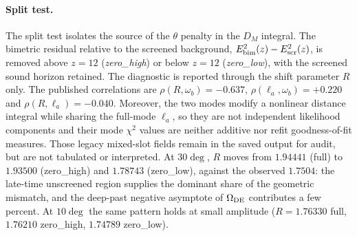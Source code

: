 \paragraph{Split test.}
The split test isolates the source of the $\theta$ penalty in the $D_M$ integral. The bimetric residual relative to the screened background, $E^2_{\rm bim}(z)-E^2_{\rm scr}(z)$, is removed above $z=12$ (\emph{zero\_high}) or below $z=12$ (\emph{zero\_low}), with the screened sound horizon retained. The diagnostic is reported through the shift parameter $R$ only. The published correlations are $\rho(R,\omega_b)=-0.637$, $\rho(\ell_a,\omega_b)=+0.220$ and $\rho(R,\ell_a)=-0.040$. Moreover, the two modes modify a nonlinear distance integral while sharing the full-mode $\ell_a$, so they are not independent likelihood components and their mode $\chi^2$ values are neither additive nor refit goodness-of-fit measures. Those legacy mixed-slot fields remain in the saved output for audit, but are not tabulated or interpreted. At $30\deg$, $R$ moves from $1.94441$ (full) to $1.93500$ (zero\_high) and $1.78743$ (zero\_low), against the observed $1.7504$: the late-time unscreened region supplies the dominant share of the geometric mismatch, and the deep-past negative asymptote of $\Omega_{\mathrm{DE}}$ contributes a few percent. At $10\deg$ the same pattern holds at small amplitude ($R=1.76330$ full, $1.76210$ zero\_high, $1.74789$ zero\_low).

